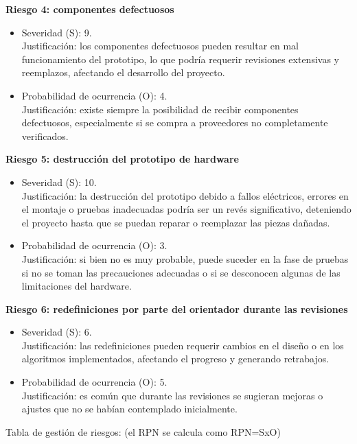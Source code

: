 \documentclass[
11pt, %
]{charter}
\begin{document}
\textbf{Riesgo 4: componentes defectuosos}
\begin{itemize}
    \item Severidad (S): 9.\\
    Justificación: los componentes defectuosos pueden resultar en mal funcionamiento del prototipo, lo que podría requerir revisiones extensivas y reemplazos, afectando el desarrollo del proyecto.
    \item Probabilidad de ocurrencia (O): 4.\\
    Justificación: existe siempre la posibilidad de recibir componentes defectuosos, especialmente si se compra a proveedores no completamente verificados.
\end{itemize}

\textbf{Riesgo 5: destrucción del prototipo de hardware}
\begin{itemize}
    \item Severidad (S): 10.\\
    Justificación: la destrucción del prototipo debido a fallos eléctricos, errores en el montaje o pruebas inadecuadas podría ser un revés significativo, deteniendo el proyecto hasta que se puedan reparar o reemplazar las piezas dañadas.
    \item Probabilidad de ocurrencia (O): 3.\\
    Justificación: si bien no es muy probable, puede suceder en la fase de pruebas si no se toman las precauciones adecuadas o si se desconocen algunas de las limitaciones del hardware.
\end{itemize}

\textbf{Riesgo 6: redefiniciones por parte del orientador durante las revisiones}
\begin{itemize}
    \item Severidad (S): 6.\\
    Justificación: las redefiniciones pueden requerir cambios en el diseño o en los algoritmos implementados, afectando el progreso y generando retrabajos.
    \item Probabilidad de ocurrencia (O): 5.\\
    Justificación: es común que durante las revisiones se sugieran mejoras o ajustes que no se habían contemplado inicialmente.
\end{itemize}

Tabla de gestión de riesgos: (el RPN se calcula como RPN=SxO)
\end{document}
